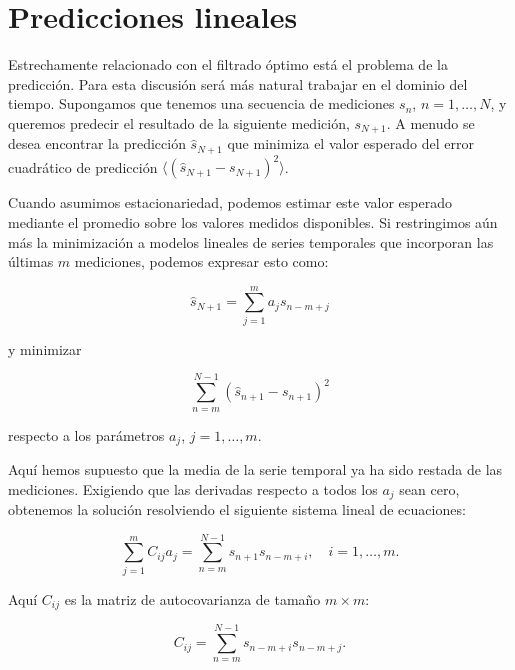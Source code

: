 \documentclass[10pt,a4paper]{book}
\begin{document}
\newpage

\section{Predicciones lineales}

Estrechamente relacionado con el filtrado óptimo está el problema de la predicción. Para esta discusión será más natural trabajar en el dominio del tiempo. Supongamos que tenemos una secuencia de mediciones $s_n$, $n = 1, \ldots, N$, y queremos predecir el resultado de la siguiente medición, $s_{N+1}$.  A menudo se desea encontrar la predicción $\hat{s}_{N+1}$ que minimiza el valor esperado del error cuadrático de predicción $\langle (\hat{s}_{N+1} - s_{N+1})^2 \rangle$.  

\bigskip

Cuando asumimos estacionariedad, podemos estimar este valor esperado mediante el promedio sobre los valores medidos disponibles. Si restringimos aún más la minimización a modelos lineales de series temporales que incorporan las últimas $m$ mediciones, podemos expresar esto como:

\begin{equation}
\hat{s}_{N+1} = \sum_{j=1}^{m} a_j s_{n-m+j}
\end{equation}

y minimizar

\begin{equation}
\sum_{n=m}^{N-1} \left( \hat{s}_{n+1} - s_{n+1} \right)^2
\end{equation}

respecto a los parámetros $a_j$, $j=1,\ldots,m$.  

\bigskip

Aquí hemos supuesto que la media de la serie temporal ya ha sido restada de las mediciones. Exigiendo que las derivadas respecto a todos los $a_j$ sean cero, obtenemos la solución resolviendo el siguiente sistema lineal de ecuaciones:

\begin{equation}
\sum_{j=1}^{m} C_{ij} a_j = \sum_{n=m}^{N-1} s_{n+1} s_{n-m+i}, 
\quad i = 1, \ldots, m.
\end{equation}

Aquí $C_{ij}$ es la matriz de autocovarianza de tamaño $m \times m$:

\begin{equation}
C_{ij} = \sum_{n=m}^{N-1} s_{n-m+i} s_{n-m+j}.
\end{equation}
\end{document}
